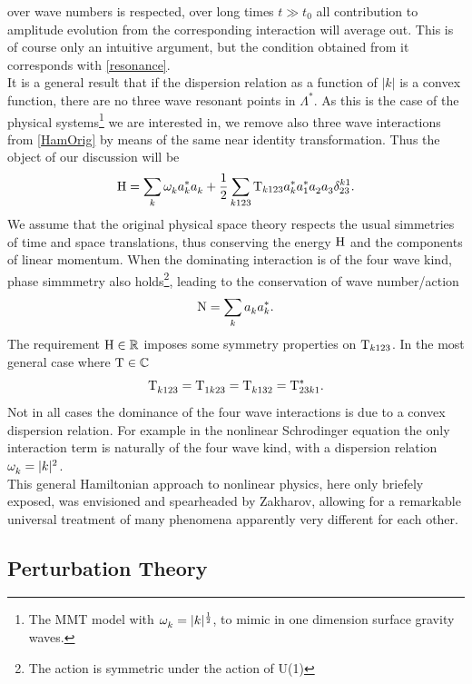 over wave numbers is respected, over long times $t \gg t_0$ all contribution to amplitude evolution from the corresponding interaction will average out. This
is of course only an intuitive argument, but the condition obtained from it corresponds with \eqref{resonance}. \\
It is a general result that if the dispersion relation as a function of $|k|$ is a convex function, there are no three wave resonant points in $\Lambda^*$. As
this is the case of the physical systems\footnote{The MMT model with $\omega^{}_k = |k|^\frac{1}{2}$, to mimic in one dimension surface gravity waves.} we are interested in,
we remove also three wave interactions from \eqref{HamOrig} by means of the same near identity transformation. 
Thus the object of our discussion will be 
\begin{equation}
    \mathrm{H} = \sum_k \omega^{}_k a_k^{*} a_k^{} + \frac{1}{2} \sum_{k123} \mathrm{T}_{k123} a_k^{*} a_1^{*} a_2^{} a_3^{} \delta_{23}^{k1}.
    \label{ham4}
\end{equation}
We assume that the original physical space theory respects the usual simmetries of time and space translations, thus conserving the energy $\mathrm{H}$ and 
the components of linear
momentum. When the dominating interaction is of the four wave kind, phase simmmetry also holds\footnote{The action is 
symmetric under the action of U(1)}, leading to the conservation of wave number/action
\begin{equation}
    \mathrm{N} = \sum_k a_k^{}a_k^{*}.
\end{equation} 
The requirement $\mathrm{H}  \in \mathbb{R}$ imposes some symmetry properties on $\mathrm{T}_{k123}$. In the most general case where $\mathrm{T} \in \mathbb{C}$
\begin{equation}
    \mathrm{T}^{}_{k123} = \mathrm{T}^{}_{1k23} = \mathrm{T}^{}_{k132} = \mathrm{T}^*_{23k1}.
\end{equation}
Not in all cases the dominance of the four wave interactions is due to a convex dispersion relation. For example in the nonlinear Schrodinger equation
the only interaction term is naturally of the four wave kind, with a dispersion relation $\omega^{}_k = |k|^2$.\\ 
This general Hamiltonian approach to nonlinear physics, here only briefely exposed, was envisioned and spearheaded by Zakharov, allowing for a remarkable universal treatment of many
phenomena apparently very different for each other. \\ 

\subsection{Perturbation Theory}

